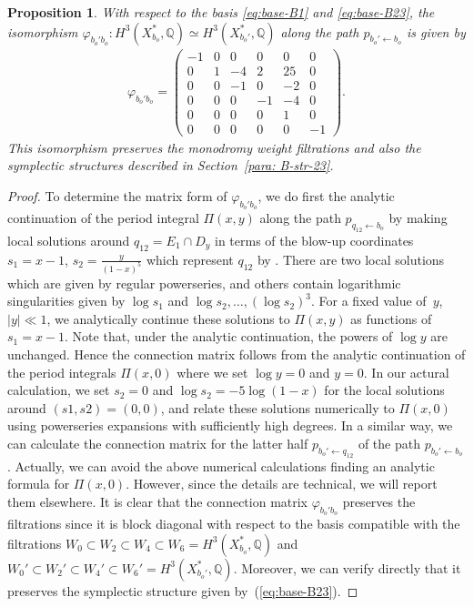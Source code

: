 \documentclass[10pt,a4paper]{amsart}
\numberwithin{equation}{section}
\newtheorem{Proposition}[Theorem]{Proposition}
\begin{document}
\begin{Proposition}\label{prop:connect-phi-21}With respect to the basis \eqref{eq:base-B1} and \eqref{eq:base-B23}, the isomorphism $\varphi_{b_{o}'b_{o}}\colon H^{3}(X_{b_{o}}^{*},\mathbb{Q})\simeq H^{3}(X_{b_{o}'}^{*},\mathbb{Q})$ along the path $p_{b_{o}'\leftarrow b_{o}}$ is given by
\begin{gather*}
\varphi_{b_{o}'b_{o}}=\left(\begin{matrix}-1 & 0 & 0 & 0 & 0 & 0\\
0 & 1 & -4 & 2 & 25 & 0\\
0 & 0 & -1 & 0 & -2 & 0\\
0 & 0 & 0 & -1 & -4 & 0\\
0 & 0 & 0 & 0 & 1 & 0\\
0 & 0 & 0 & 0 & 0 & -1
\end{matrix}\right).
\end{gather*}
This isomorphism preserves the monodromy weight filtrations and also the symplectic structures described in Section~{\rm \ref{para: B-str-23}}. \end{Proposition}

\begin{proof} To determine the matrix form of $\varphi_{b_{o}'b_{o}}$, we do first the analytic continuation of the period integral $\Pi(x,y)$ along
the path $p_{q_{12}\leftarrow b_{o}}$ by making local solutions around $q_{12}=E_{1}\cap D_{y}$ in terms of the blow-up coordinates $s_{1}=x-1$, $s_{2}=\frac{y}{(1-x)^{5}}$ which represent $q_{12}$ by . There are two local solutions which are given by regular powerseries, and others contain logarithmic singularities given by $\log s_{1}$ and $\log s_{2},\dots,(\log s_{2})^{3}$. For a fixed value of~$y$, $|y|\ll1$, we analytically continue these solutions to $\Pi(x,y)$ as functions of $s_{1}=x-1$. Note that, under the analytic continuation, the powers of $\log y$ are unchanged. Hence the connection matrix follows from the analytic continuation of the period integrals $\Pi(x,0)$ where we set $\log y=0$ and $y=0$. In our actural calculation, we set $s_{2}=0$ and $\log s_{2}=-5\log(1-x)$ for the local solutions around $(s1,s2)=(0,0)$, and relate these solutions numerically to $\Pi(x,0)$ using powerseries expansions with sufficiently high degrees. In a similar way, we can calculate the connection matrix for the latter half $p_{b_{o}'\leftarrow q_{12}}$ of the path $p_{b_{o}'\leftarrow b_{o}}$. Actually, we can avoid the above numerical calculations finding an analytic formula for $\Pi(x,0)$. However, since the details are technical, we will report them elsewhere. It is clear that the connection matrix $\varphi_{b_{o}'b_{o}}$ preserves the filtrations since it is block diagonal with respect to the basis compatible with the filtrations $W_{0}\subset W_{2}\subset W_{4}\subset W_{6}=H^{3}(X_{b_{o}}^{*},\mathbb{Q})$ and $W_{0}'\subset W_{2}'\subset W_{4}'\subset W_{6}'=H^{3}(X_{b_{o}'}^{*},\mathbb{Q})$. Moreover, we can verify directly that it preserves the symplectic structure given by~(\ref{eq:base-B23}).
\end{proof}
\end{document}
